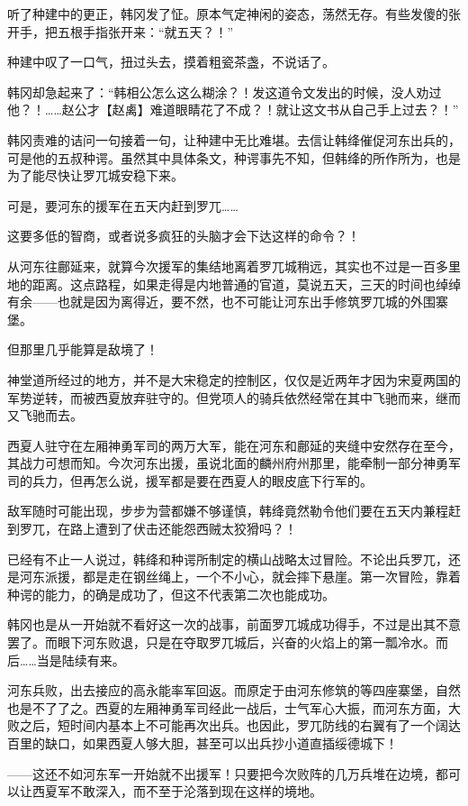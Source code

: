 听了种建中的更正，韩冈发了怔。原本气定神闲的姿态，荡然无存。有些发傻的张开手，把五根手指张开来：“就五天？！”

种建中叹了一口气，扭过头去，摸着粗瓷茶盏，不说话了。

韩冈却急起来了：“韩相公怎么这么糊涂？！发这道令文发出的时候，没人劝过他？！……赵公才【赵禼】难道眼睛花了不成？！就让这文书从自己手上过去？！”

韩冈责难的诘问一句接着一句，让种建中无比难堪。去信让韩绛催促河东出兵的，可是他的五叔种谔。虽然其中具体条文，种谔事先不知，但韩绛的所作所为，也是为了能尽快让罗兀城安稳下来。

可是，要河东的援军在五天内赶到罗兀……

这要多低的智商，或者说多疯狂的头脑才会下达这样的命令？！

从河东往鄜延来，就算今次援军的集结地离着罗兀城稍远，其实也不过是一百多里地的距离。这点路程，如果走得是内地普通的官道，莫说五天，三天的时间也绰绰有余——也就是因为离得近，要不然，也不可能让河东出手修筑罗兀城的外围寨堡。

但那里几乎能算是敌境了！

神堂道所经过的地方，并不是大宋稳定的控制区，仅仅是近两年才因为宋夏两国的军势逆转，而被西夏放弃驻守的。但党项人的骑兵依然经常在其中飞驰而来，继而又飞驰而去。

西夏人驻守在左厢神勇军司的两万大军，能在河东和鄜延的夹缝中安然存在至今，其战力可想而知。今次河东出援，虽说北面的麟州府州那里，能牵制一部分神勇军司的兵力，但再怎么说，援军都是要在西夏人的眼皮底下行军的。

敌军随时可能出现，步步为营都嫌不够谨慎，韩绛竟然勒令他们要在五天内兼程赶到罗兀，在路上遭到了伏击还能怨西贼太狡猾吗？！

已经有不止一人说过，韩绛和种谔所制定的横山战略太过冒险。不论出兵罗兀，还是河东派援，都是走在钢丝绳上，一个不小心，就会摔下悬崖。第一次冒险，靠着种谔的能力，的确是成功了，但这不代表第二次也能成功。

韩冈也是从一开始就不看好这一次的战事，前面罗兀城成功得手，不过是出其不意罢了。而眼下河东败退，只是在夺取罗兀城后，兴奋的火焰上的第一瓢冷水。而后……当是陆续有来。

河东兵败，出去接应的高永能率军回返。而原定于由河东修筑的等四座寨堡，自然也是不了了之。西夏的左厢神勇军司经此一战后，士气军心大振，而河东方面，大败之后，短时间内基本上不可能再次出兵。也因此，罗兀防线的右翼有了一个阔达百里的缺口，如果西夏人够大胆，甚至可以出兵抄小道直插绥德城下！

——这还不如河东军一开始就不出援军！只要把今次败阵的几万兵堆在边境，都可以让西夏军不敢深入，而不至于沦落到现在这样的境地。

